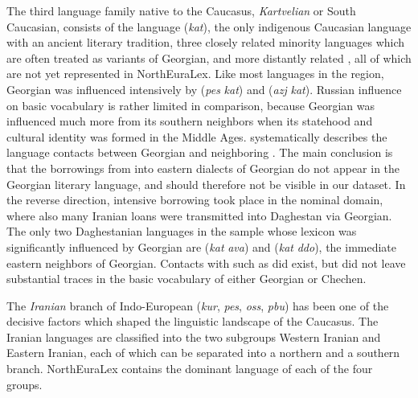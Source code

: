 The third language family native to the Caucasus, \textit{Kartvelian} or South Caucasian, consists of the  language (\textit{kat}), the only indigenous Caucasian language with an ancient literary tradition, three closely related minority languages which are often treated as variants of Georgian, and more distantly related , all of which are not yet represented in NorthEuraLex. Like most languages in the region, Georgian was influenced intensively by  (\textit{pes} \arrowLA \textit{kat}) and  (\textit{azj} \arrowLA \textit{kat}). Russian influence on basic vocabulary is rather limited in comparison, because Georgian was influenced much more from its southern neighbors when its statehood and cultural identity was formed in the Middle Ages. \cite{khalilov1993} systematically describes the language contacts between Georgian and neighboring . The main conclusion 
is that the borrowings from  into eastern dialects of Georgian do not appear in the Georgian literary language, and should therefore not be visible in our dataset. In the reverse direction, intensive borrowing took place in the nominal domain, where also many Iranian loans were transmitted into Daghestan via Georgian. The only two Daghestanian languages in the sample whose lexicon was significantly influenced by Georgian are  (\textit{kat} \arrowLA \textit{ava}) and  (\textit{kat} \arrowLA \textit{ddo}), the immediate eastern neighbors of Georgian. Contacts with  such as  did exist, but did not leave substantial traces in the basic vocabulary of either Georgian or Chechen.

The \textit{Iranian} branch of Indo-European (\textit{kur}, \textit{pes}, \textit{oss}, \textit{pbu}) has been one of the decisive factors which shaped the linguistic landscape of the Caucasus. The Iranian languages are classified into the two subgroups Western Iranian and Eastern Iranian, each of which can be separated into a northern and a southern branch. NorthEuraLex contains the dominant language of each of the four groups.

